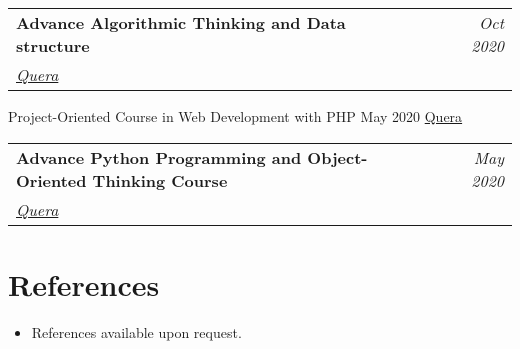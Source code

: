 \documentclass[letterpaper,11pt]{article}
\makeatletter
\newcommand{\resumeOrganizationHeading}[4]{
  \vspace{-2pt}\item
    \begin{tabular*}{0.97\textwidth}[t]{l@{\extracolsep{\fill}}r}
      \textbf{#1} & \textit{\small #2} \\
      \textit{\small#3}
    \end{tabular*}\vspace{-7pt}
}
\newcommand{\resumeSubHeadingListStart}{\begin{itemize}[leftmargin=0.15in, label={}]}
\newcommand{\resumeSubHeadingListEnd}{\end{itemize}}
\makeatother
\begin{document}
\resumeOrganizationHeading
{Advance Algorithmic Thinking and Data structure} {Oct 2020}
{\href{https://quera.org/certificate/TutKPvCg/}{\color{blue}Quera}}

\resumeOrganizationHeading
{Project-Oriented Course in Web Development with PHP} {May 2020}
{\href{https://quera.org/certificate/Au1OnMWM/}{\color{blue}Quera}}

\resumeOrganizationHeading
{Advance Python Programming and Object-Oriented Thinking Course} {May 2020}
{\href{https://quera.org/certificate/Au1OnMWM/}{\color{blue}Quera}}

\resumeSubHeadingListEnd








\section{References}
\vspace{2pt}
\resumeSubHeadingListStart
\item{References available upon request.}
\resumeSubHeadingListEnd

\end{document}

